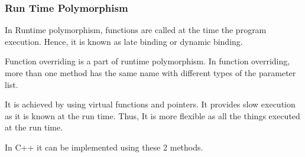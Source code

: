\documentclass[11pt]{article}
\begin{document}
\subsubsection*{Run Time Polymorphism}

In Runtime polymorphism, functions are called at the time the program execution. Hence, it is known as late binding or dynamic binding.

Function overriding is a part of runtime polymorphism. In function overriding, more than one method has the same name with different types of the parameter list.

It is achieved by using virtual functions and pointers. It provides slow execution as it is known at the run time. Thus, It is more flexible as all the things executed at the run time.

In C++ it can be implemented using these 2 methods.
\end{document}
